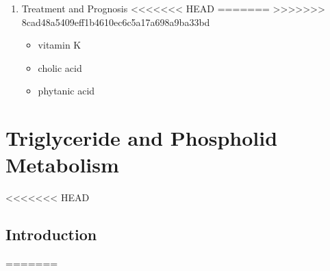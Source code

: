 \documentclass{scrartcl}
\begin{document}
\begin{itemize}
\begin{enumerate}
\begin{enumerate}
\begin{enumerate}
\begin{itemize}
\begin{enumerate}
\begin{enumerate}
\begin{enumerate}

\item Treatment and Prognosis
<<<<<<< HEAD
\label{sec:orgc972274}
=======
\label{sec:orgf2a21d7}
>>>>>>> 8cad48a5409eff1b4610ec6c5a17a698a9ba33bd
\begin{itemize}
\item vitamin K
\item cholic acid
\item phytanic acid
\end{itemize}
\end{enumerate}
\section{Triglyceride and Phospholid Metabolism}
<<<<<<< HEAD
\label{sec:orgfce6b1c}
\subsection{Introduction}
\label{sec:orgca88843}
=======
\label{sec:org2c83c62}

\end{enumerate}
\end{enumerate}
\end{itemize}
\end{enumerate}
\end{enumerate}
\end{enumerate}
\end{itemize}
\end{document}
